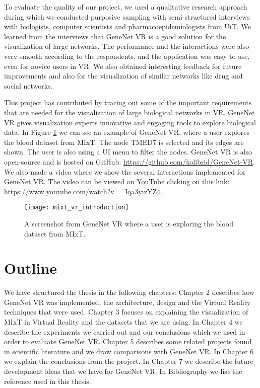 To evaluate the quality of our project, we used a qualitative research approach during which we conducted purposive sampling with semi-structured interviews with biologists, computer scientists and pharmacoepidemiologists from UiT. We learned from the interviews that GeneNet VR is a good solution for the visualization of large networks. The performance and the interactions were also very smooth according to the respondents, and the application was easy to use, even for novice users in VR. We also obtained interesting feedback for future improvements and also for the visualization of similar networks like drug and social networks.

This project has contributed by tracing out some of the important requirements that are needed for the visualization of large biological networks in VR. GeneNet VR gives visualization experts innovative and engaging tools to explore biological data. In Figure \ref{fig:bignet_intro} we can see an example of GeneNet VR, where a user explores the blood dataset from MIxT. The node TMED7 is selected and its edges are shown. The user is also using a UI menu to filter the nodes. GeneNet VR is also open-source and is hosted on GitHub: \url{https://github.com/kolibrid/GeneNet-VR}. We also made a video where we show the several interactions implemented for GeneNet VR. The video can be viewed on YouTube clicking on this link: \url{https://www.youtube.com/watch?v=\_Iqa3yizYZ4}.

\begin{figure}[h!]
    \newlength{\tempheight}
    \setlength{\tempheight}{15ex}
    \centering
    \texttt{[image: mixt\_vr\_introduction]}
    \caption{A screenshot from GeneNet VR where a user is exploring the blood dataset from MIxT.}
    \label{fig:bignet_intro}
\end{figure}


\section{Outline}

We have structured the thesis in the following chapters: Chapter 2 describes how GeneNet VR was implemented, the architecture, design and the Virtual Reality techniques that were used. Chapter 3 focuses on explaining the visualization of MIxT in Virtual Reality and the datasets that we are using. In Chapter 4 we describe the experiments we carried out and our conclusions which we used in order to evaluate GeneNet VR. Chapter 5 describes some related projects found in scientific literature and we draw comparisons with GeneNet VR. In Chapter 6 we explain the conclusions from the project. In Chapter 7 we describe the future development ideas that we have for GeneNet VR. In Bibliography we list the reference used in this thesis.
